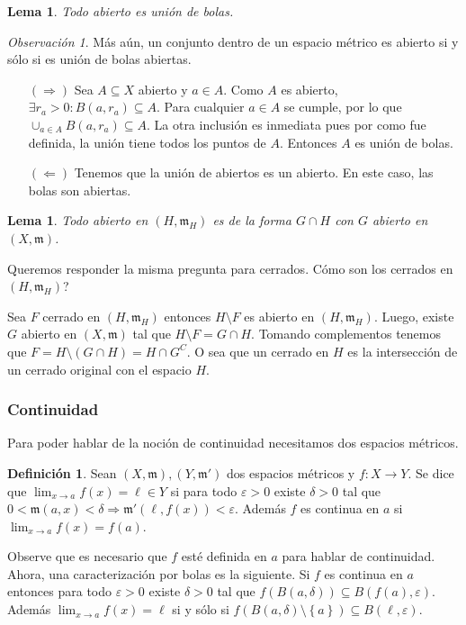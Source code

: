 \documentclass[12pt]{article}
\theoremstyle{plain}
\newtheorem{Lem}[Th]{Lema}             %
\theoremstyle{definition}
\newtheorem{Def}[Th]{Definición}       %
\theoremstyle{remark}
\newtheorem{Rmk}[Th]{Observación}      %
\numberwithin{equation}{section}
\newcommand{\mm}{\mathfrak{m}}      %
\renewcommand{\:}{\colon}           %
\newcommand{\conj}[1]{\left\lbrace#1\right\rbrace}
\begin{document}
\begin{multicols}{2}
\begin{Lem}
  Todo abierto es unión de bolas.
\end{Lem}

\begin{Rmk}\label{abiertoIffBolas}
  Más aún, un conjunto dentro de un espacio métrico es abierto si y sólo si es unión de bolas abiertas.
\end{Rmk}

\begin{ptcb}
\begin{enumerate}
  \item[$(\Rightarrow)$] Sea $A\subseteq X$ abierto y $a\in A$. Como $A$ es abierto, $\exists r_a>0\colon B(a,r_a)\subseteq A$. Para cualquier $a\in A$ se cumple, por lo que $\cup_{a\in A}B(a,r_a)\subseteq A$. La otra inclusión es inmediata pues por como fue definida, la unión tiene todos los puntos de $A$. Entonces $A$ es unión de bolas.
  \item[$(\Leftarrow)$] Tenemos que la unión de abiertos es un abierto. En este caso, las bolas son abiertas.
\end{enumerate}
\end{ptcb}

\begin{Lem}
  Todo abierto en $(H,\mm_H)$ es de la forma $G\cap H$ con $G$ abierto en $(X,\mm)$.
\end{Lem}

Queremos responder la misma pregunta para cerrados. Cómo son los cerrados en $(H,\mm_H)$?\par
Sea $F$ cerrado en $(H,\mm_H)$ entonces $H\setminus F$ es abierto en $(H,\mm_H)$. Luego, existe $G$ abierto en $(X,\mm)$ tal que $H\setminus F = G\cap H$. Tomando complementos tenemos que $F=H\setminus(G\cap H)= H\cap G^C$. O sea que un cerrado en $H$ es la intersección de un cerrado original con el espacio $H$.

\subsubsection*{Continuidad}

Para poder hablar de la noción de continuidad necesitamos dos espacios métricos.

\begin{Def}
  Sean $(X,\mm),(Y,\mm')$ dos espacios métricos y $f\colon X\to Y$. Se dice que $\lim_{x\to a}f(x)=\ell\in Y$ si para todo $\varepsilon>0$ existe $\delta>0$ tal que
  $0<\mm(a,x)<\delta\Rightarrow \mm'(\ell,f(x))<\varepsilon$. Además $f$ es continua en $a$ si $\lim_{x\to a}f(x)=f(a)$.
\end{Def}
 Observe que es necesario que $f$ esté definida en $a$ para hablar de continuidad. Ahora, una caracterización por bolas es la siguiente. Si $f$ es continua en $a$ entonces para todo $\varepsilon>0$ existe $\delta >0$ tal que $f\left(B(a,\delta)\right)\subseteq B(f(a),\varepsilon)$. Además $\lim_{x\to a} f(x)=\ell$ si y sólo si $f\left(B(a,\delta)\setminus\conj{a}\right)\subseteq B(\ell,\varepsilon)$.


\end{multicols}
\end{document}
